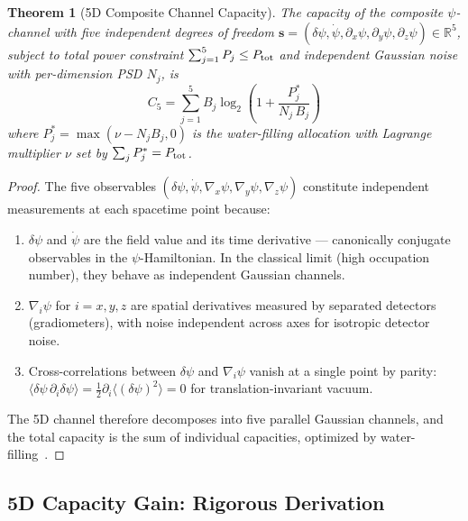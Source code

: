 \documentclass[twocolumn,superscriptaddress,prd,nofootinbib]{revtex4-2}
\newtheorem{theorem}{Theorem}
\begin{document}
\begin{theorem}[5D Composite Channel Capacity]\label{thm:5D-capacity}
The capacity of the composite $\psi$-channel with five independent
degrees of freedom $\mathbf{s} = (\delta\psi, \dot\psi, \partial_x\psi,
\partial_y\psi, \partial_z\psi) \in \mathbb{R}^5$, subject to total power
constraint $\sum_{j=1}^5 P_j \leq P_{\rm tot}$ and independent Gaussian
noise with per-dimension PSD $N_j$, is
\begin{equation}
\boxed{
C_5 = \sum_{j=1}^{5} B_j\log_2\!\left(1 + \frac{P_j^*}{N_j\,B_j}\right)
}
\label{eq:C5}
\end{equation}
where $P_j^* = \max(\nu - N_j B_j, 0)$ is the water-filling allocation
with Lagrange multiplier $\nu$ set by $\sum_j P_j^* = P_{\rm tot}$.
\end{theorem}

\begin{proof}
The five observables $(\delta\psi, \dot\psi, \nabla_x\psi, \nabla_y\psi,
\nabla_z\psi)$ constitute independent measurements at each spacetime
point because:
\begin{enumerate}
\item $\delta\psi$ and $\dot\psi$ are the field value and its time
derivative --- canonically conjugate observables in the $\psi$-Hamiltonian.
In the classical limit (high occupation number), they behave as
independent Gaussian channels.
\item $\nabla_i\psi$ for $i=x,y,z$ are spatial derivatives measured by
separated detectors (gradiometers), with noise independent across axes
for isotropic detector noise.
\item Cross-correlations between $\delta\psi$ and $\nabla_i\psi$ vanish
at a single point by parity: $\langle\delta\psi\,\partial_i\delta\psi\rangle
= \frac{1}{2}\partial_i\langle(\delta\psi)^2\rangle = 0$ for
translation-invariant vacuum.
\end{enumerate}
The 5D channel therefore decomposes into five parallel Gaussian channels,
and the total capacity is the sum of individual capacities, optimized by
water-filling~\cite{CoverThomas2006}.
\end{proof}

\subsection{5D Capacity Gain: Rigorous Derivation}
\end{document}
